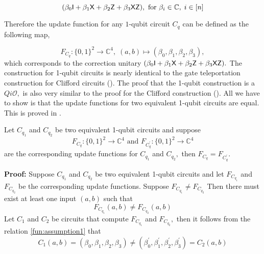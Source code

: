 \begin{equation}
\label{eq:pgate9}
 (\beta_0 {\sf I} +   \beta_1 {\sf X} +  \beta_2 {\sf Z} +  \beta_3 {\sf X}{\sf Z}), \mbox{ for }  \beta_i \in \mathbb{C},\; i\in[n]
\end{equation}

Therefore the update function for any $1$-qubit circuit $C_q$ can be defined as the following map,

\begin{equation*}
F_{C_q}:\{0,1\}^2\rightarrow \mathbb{C}^4,\; (a,b)\mapsto (\beta_0, \beta_1,\beta_2,\beta_3),
\end{equation*}
which corresponds to the correction unitary $(\beta_0 {\sf I} +  \beta_1 {\sf X} + \beta_2 {\sf Z} + \beta_3{\sf X} {\sf Z}).$
The construction for  1-qubit circuits is nearly identical to the gate teleportation construction for Clifford circuits (). The proof that the 1-qubit construction is a $Qi\mathcal{O},$ is also very similar to the proof for the Clifford construction (). All we have to show is that the update functions for two equivalent 1-qubit circuits are equal. This is proved in  . 



\begin{lemma}
\label{lemma:1qubit}
Let $C_{q_1}$ and $C_{q_2}$ be two equivalent 1-qubit circuits and suppose
\begin{equation*}
F_{C_q}:\{0,1\}^2\rightarrow \mathbb{C}^4 \mbox{ and } F_{C_q^\prime}:\{0,1\}^2\rightarrow \mathbb{C}^4
\end{equation*}
are the corresponding update functions for $C_{q_1}$  and $C_{q_2},$   then $F_{C_q}=F_{C_q^\prime}.$
\end{lemma}

{\bf Proof:}  Suppose $C_{q_1}$ and $C_{q_2}$ be two equivalent 1-qubit circuits and let $F_{C_{q_1}}$ and $F_{C_{q_2}}$ be the corresponding update functions. Suppose $F_{C_{q_1}}\neq F_{C_{q_2}}$ Then there must exist at least one input $(a,b)$ such that
\begin{equation}
\label{fun:assumption1}
F_{C_{q_1}}(a,b)\neq F_{C_{q_2}}(a,b)
\end{equation}
Let $C_1$ and $C_2$ be circuits that compute $F_{C_{q_1}}$ and $F_{C_{q_2}},$ then it follows from the relation \ref{fun:assumption1} that
\begin{equation*}
C_1(a,b)=(\beta_0, \beta_1, \beta_2 , \beta_3)\neq (\beta_0^\prime, \beta_1^\prime, \beta_2^\prime , \beta_3^\prime)=C_2(a,b)
\end{equation*}

